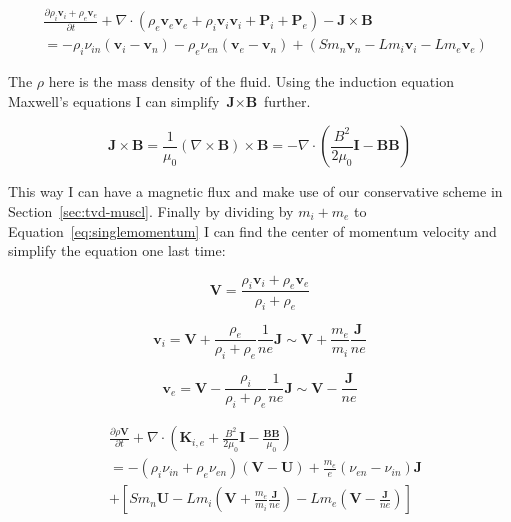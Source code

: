 \documentclass[12pt,upcase]{umlthesis}
\begin{document}
\begin{equation}\label{eq:singlemomentum}
	\begin{aligned}
		& \frac{\partial \rho_i \textbf{v}_i + \rho_e \textbf{v}_e}{\partial t} + \nabla \cdot (\rho_e \textbf{v}_e \textbf{v}_e + \rho_i \textbf{v}_i \textbf{v}_i + \textbf{P}_i + \textbf{P}_e) - \textbf{J} \times \textbf{B} \\
		& = - \rho_i \nu_{in}(\textbf{v}_i - \textbf{v}_n) - \rho_e \nu_{en} (\textbf{v}_e - \textbf{v}_n)+ (S m_n \textbf{v}_n - L m_i \textbf{v}_i - L m_e \textbf{v}_e)
\end{aligned}
\end{equation}

The $\rho$ here is the mass density of the fluid. Using the induction equation Maxwell's equations I can simplify $\textbf{J} \times \textbf{B}$ further.

\begin{equation}
	\textbf{J} \times \textbf{B} = \frac{1}{\mu_0} (\nabla \times \textbf{B}) \times \textbf{B} = -\nabla \cdot (\frac{B^2}{2\mu_0}\textbf{I} - \textbf{BB})
\end{equation}

This way I can have a magnetic flux and make use of our conservative scheme in Section~\ref{sec:tvd-muscl}. Finally by dividing by $m_i+m_e$ to Equation~\ref{eq:singlemomentum} I can find the center of momentum velocity and simplify the equation one last time:

\begin{equation}
	\textbf{V} = \frac{\rho_i \textbf{v}_i + \rho_e \textbf{v}_e}{\rho_i+\rho_e}
\end{equation}

\begin{equation}\label{eq:vi}
	\textbf{v}_i = \textbf{V} + \frac{\rho_e}{\rho_i+\rho_e} \frac{1}{n e} \textbf{J} \sim \textbf{V} + \frac{m_e}{m_i} \frac{\textbf{J}}{n e} 
\end{equation}

\begin{equation}\label{eq:ve}
	\textbf{v}_e = \textbf{V} - \frac{\rho_i}{\rho_i+\rho_e} \frac{1}{n e} \textbf{J} \sim \textbf{V} -\frac{\textbf{J} }{n e}
\end{equation}

\begin{equation}\label{eq:momentumcom}
\begin{aligned}
	&\frac{\partial \rho \textbf{V}}{\partial t} + \nabla \cdot (\textbf{K}_{i,e} + \frac{B^2}{2\mu_0}\textbf{I} - \frac{\textbf{BB}}{\mu_0}) \\
	&= - (\rho_i \nu_{in} + \rho_e \nu_{en})(\textbf{V} - \textbf{U}) + \frac{m_e}{e}(\nu_{en}-\nu_{in}) \textbf{J} \\
	& + [S m_n \textbf{U} - L m_i (\textbf{V} + \frac{m_e}{m_i} \frac{\textbf{J}}{n e})- L m_e (\textbf{V} -\frac{\textbf{J}}{n e})]
\end{aligned}
\end{equation}
\end{document}
